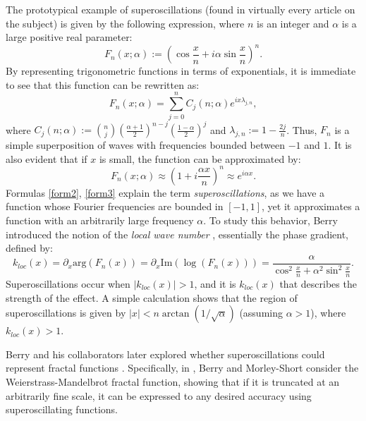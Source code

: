 \documentclass[reqno,11pt]{amsart}
\theoremstyle{definition}
\begin{document}
The prototypical example of superoscillations (found in virtually every article on the subject) is given by the following expression, where $n$ is an integer and $\alpha$ is a large positive real parameter:
\begin{equation}\label{form1}
F_n(x;\alpha) := \left(\cos \frac{x}{n} + i\alpha \sin \frac{x}{n} \right)^n.
\end{equation}
By representing trigonometric functions in terms of exponentials, it is immediate to see that this function can be rewritten as:
\begin{equation}\label{form2}
F_n(x;\alpha) = \sum_{j=0}^n C_j(n;\alpha)e^{ix\lambda_{j,n}},
\end{equation}
where $C_j(n;\alpha) := \binom{n}{j} \left(\frac{\alpha+1}{2}\right)^{n-j} \left(\frac{1-\alpha}{2}\right)^j$ and $\lambda_{j,n} := 1-\frac{2j}{n}$.
Thus, $F_n$ is a simple superposition of waves with frequencies bounded between $-1$ and $1$. It is also evident that if $x$ is small, the function can be approximated by:
\begin{equation}\label{form3}
F_n(x;\alpha) \approx \left(1 + i\frac{\alpha x}{n}\right)^n \approx e^{i\alpha x}.
\end{equation}
Formulas \eqref{form2}, \eqref{form3} explain the term \textit{superoscillations}, as we have a function whose Fourier frequencies are bounded in $[-1,1]$, yet it approximates a function with an arbitrarily large frequency $\alpha$. To study this behavior, Berry introduced the notion of the \textit{local wave number} \cite{berry1994}, essentially the phase gradient, defined by:
\begin{equation}
k_{loc}(x) = \partial_x \text{arg}(F_n(x)) = \partial_x \text{Im}(\log(F_n(x))) = \frac{\alpha}{\cos^2 \frac{x}{n} + \alpha^2 \sin^2 \frac{x}{n}}.
\end{equation}
Superoscillations occur when $|k_{loc}(x)| > 1$, and it is $k_{loc}(x)$ that describes the strength of the effect. A simple calculation shows that the region of superoscillations is given by $|x| < n \arctan(1/\sqrt{\alpha})$ (assuming $\alpha > 1$), where $k_{loc}(x) > 1$.



Berry and his collaborators later explored whether superoscillations could represent fractal functions \cite{berry2016fractals, berry1980}. Specifically, in \cite{berry2016fractals}, Berry and Morley-Short consider the Weierstrass-Mandelbrot fractal function, showing that if it is truncated at an arbitrarily fine scale, it can be expressed to any desired accuracy using superoscillating functions.
\end{document}
